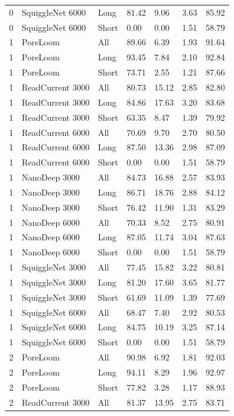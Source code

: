 \begin{longtable}{lllllll}
0 & SquiggleNet 6000 & Long & 81.42 & 9.06 & 3.63 & 85.92\\
0 & SquiggleNet 6000 & Short & 0.00 & 0.00 & 1.51 & 58.79\\
1 & PoreLoom & All & 89.66 & 6.39 & 1.93 & 91.64\\
1 & PoreLoom & Long & 93.45 & 7.84 & 2.10 & 92.84\\
1 & PoreLoom & Short & 73.71 & 2.55 & 1.21 & 87.66\\
1 & ReadCurrent 3000 & All & 80.73 & 15.12 & 2.85 & 82.80\\
1 & ReadCurrent 3000 & Long & 84.86 & 17.63 & 3.20 & 83.68\\
1 & ReadCurrent 3000 & Short & 63.35 & 8.47 & 1.39 & 79.92\\
1 & ReadCurrent 6000 & All & 70.69 & 9.70 & 2.70 & 80.50\\
1 & ReadCurrent 6000 & Long & 87.50 & 13.36 & 2.98 & 87.09\\
1 & ReadCurrent 6000 & Short & 0.00 & 0.00 & 1.51 & 58.79\\
1 & NanoDeep 3000 & All & 84.73 & 16.88 & 2.57 & 83.93\\
1 & NanoDeep 3000 & Long & 86.71 & 18.76 & 2.88 & 84.12\\
1 & NanoDeep 3000 & Short & 76.42 & 11.90 & 1.31 & 83.29\\
1 & NanoDeep 6000 & All & 70.33 & 8.52 & 2.75 & 80.91\\
1 & NanoDeep 6000 & Long & 87.05 & 11.74 & 3.04 & 87.63\\
1 & NanoDeep 6000 & Short & 0.00 & 0.00 & 1.51 & 58.79\\
1 & SquiggleNet 3000 & All & 77.45 & 15.82 & 3.22 & 80.81\\
1 & SquiggleNet 3000 & Long & 81.20 & 17.60 & 3.65 & 81.77\\
1 & SquiggleNet 3000 & Short & 61.69 & 11.09 & 1.39 & 77.69\\
1 & SquiggleNet 6000 & All & 68.47 & 7.40 & 2.92 & 80.53\\
1 & SquiggleNet 6000 & Long & 84.75 & 10.19 & 3.25 & 87.14\\
1 & SquiggleNet 6000 & Short & 0.00 & 0.00 & 1.51 & 58.79\\
2 & PoreLoom & All & 90.98 & 6.92 & 1.81 & 92.03\\
2 & PoreLoom & Long & 94.11 & 8.29 & 1.96 & 92.97\\
2 & PoreLoom & Short & 77.82 & 3.28 & 1.17 & 88.93\\
2 & ReadCurrent 3000 & All & 81.37 & 13.95 & 2.75 & 83.71\\

\end{longtable}
